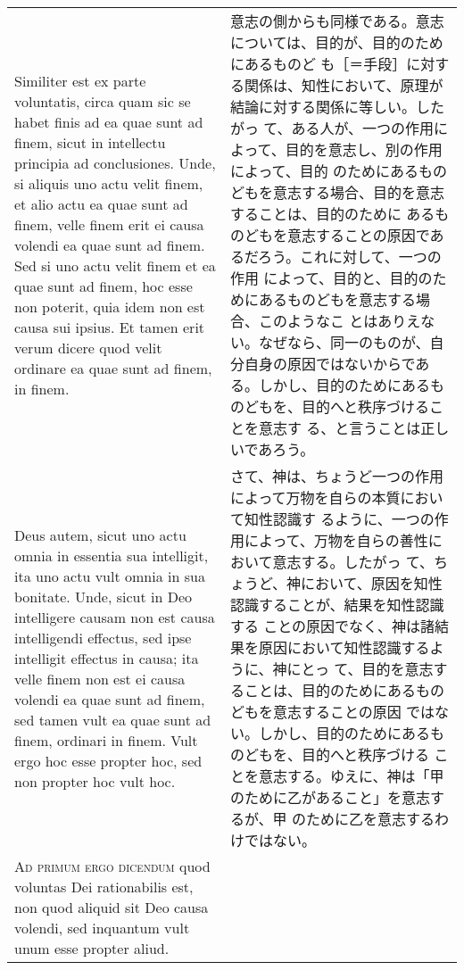\documentclass[10pt]{jsarticle} %
\begin{document}
\begin{longtable}{p{21em}p{21em}}
\\


Similiter est ex parte voluntatis, circa quam sic se habet
finis ad ea quae sunt ad finem, sicut in intellectu principia ad
conclusiones. Unde, si aliquis uno actu velit finem, et alio actu ea
quae sunt ad finem, velle finem erit ei causa volendi ea quae sunt ad
finem. Sed si uno actu velit finem et ea quae sunt ad finem, hoc esse
non poterit, quia idem non est causa sui ipsius. Et tamen erit verum
dicere quod velit ordinare ea quae sunt ad finem, in finem. 

&

意志の側からも同様である。意志については、目的が、目的のためにあるものど
 も［＝手段］に対する関係は、知性において、原理が結論に対する関係に等しい。したがっ
 て、ある人が、一つの作用によって、目的を意志し、別の作用によって、目的
 のためにあるものどもを意志する場合、目的を意志することは、目的のために
 あるものどもを意志することの原因であるだろう。これに対して、一つの作用
 によって、目的と、目的のためにあるものどもを意志する場合、このようなこ
 とはありえない。なぜなら、同一のものが、自分自身の原因ではないからであ
 る。しかし、目的のためにあるものどもを、目的へと秩序づけることを意志す
 る、と言うことは正しいであろう。

\\


Deus autem,
sicut uno actu omnia in essentia sua intelligit, ita uno actu vult omnia
in sua bonitate. Unde, sicut in Deo intelligere causam non est causa
intelligendi effectus, sed ipse intelligit effectus in causa; ita velle
finem non est ei causa volendi ea quae sunt ad finem, sed tamen vult ea
quae sunt ad finem, ordinari in finem. Vult ergo hoc esse propter hoc,
sed non propter hoc vult hoc.


&

さて、神は、ちょうど一つの作用によって万物を自らの本質において知性認識す
 るように、一つの作用によって、万物を自らの善性において意志する。したがっ
 て、ちょうど、神において、原因を知性認識することが、結果を知性認識する
 ことの原因でなく、神は諸結果を原因において知性認識するように、神にとっ
 て、目的を意志することは、目的のためにあるものどもを意志することの原因
 ではない。しかし、目的のためにあるものどもを、目的へと秩序づける
 ことを意志する。ゆえに、神は「甲のために乙があること」を意志するが、甲
 のために乙を意志するわけではない。

\\


{\scshape Ad primum ergo dicendum} quod voluntas Dei
rationabilis est, non quod aliquid sit Deo causa volendi, sed inquantum
vult unum esse propter aliud.



\end{longtable}
\end{document}
